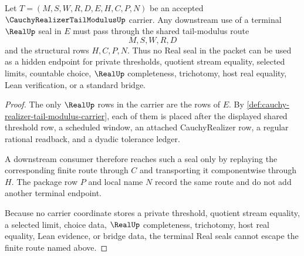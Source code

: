 \begin{theorem}
\label{thm:cauchy-realizer-tail-modulus-real-seal-nonescape}
Let $T=(M,S,W,R,D,E,H,C,P,N)$ be an accepted $\CauchyRealizerTailModulusUp$ carrier. Any downstream use of a terminal $\RealUp$ seal in $E$ must pass through the shared tail-modulus route
$$
M,S,W,R,D
$$
and the structural rows $H,C,P,N$. Thus no Real seal in the packet can be used as a hidden endpoint for private thresholds, quotient stream equality, selected limits, countable choice, $\RealUp$ completeness, trichotomy, host real equality, Lean verification, or a standard bridge.
\end{theorem}
\begin{proof}
The only $\RealUp$ rows in the carrier are the rows of $E$. By \autoref{def:cauchy-realizer-tail-modulus-carrier}, each of them is placed after the displayed shared threshold row, a scheduled window, an attached CauchyRealizer row, a regular rational readback, and a dyadic tolerance ledger.

A downstream consumer therefore reaches such a seal only by replaying the corresponding finite route through $C$ and transporting it componentwise through $H$. The package row $P$ and local name $N$ record the same route and do not add another terminal endpoint.

Because no carrier coordinate stores a private threshold, quotient stream equality, a selected limit, choice data, $\RealUp$ completeness, trichotomy, host real equality, Lean evidence, or bridge data, the terminal Real seals cannot escape the finite route named above.
\end{proof}




